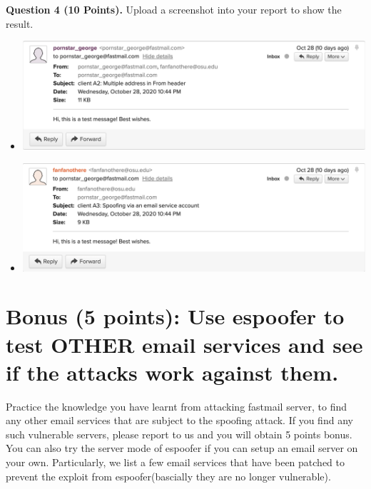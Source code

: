\documentclass[11pt]{article}
\newcommand{\espoofer}{{\sf espoofer}\xspace}
\begin{document}
\begin{enumerate}
\textbf{Question 4 (10 Points).} Upload a screenshot into your report to show the result.

\begin{itemize}
  \item \includegraphics[width=0.88\columnwidth]{a2.png}
  \item \includegraphics[width=0.88\columnwidth]{a3.png}
\end{itemize}

\end{enumerate}




\section{Bonus (5 points): Use \espoofer to test OTHER email services and see if the attacks work against them. }


Practice the knowledge you have learnt from attacking fastmail server, to find any other email services that are subject to the spoofing attack. %
If you find any such vulnerable servers, please report to us and you will obtain 5 points bonus. You can also try the server mode of \espoofer if you can setup an email server on your own. Particularly, we list a few email services that have been patched to prevent the exploit from \espoofer (bascially they are no longer vulnerable).
\end{document}
